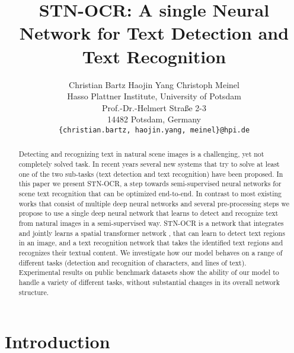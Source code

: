 \documentclass[10pt,twocolumn,letterpaper]{article}
\author{Christian Bartz \qquad Haojin Yang \qquad Christoph Meinel\\
Hasso Plattner Institute, University of Potsdam\\
Prof.-Dr.-Helmert Straße 2-3\\ 14482 Potsdam, Germany\\
{\tt\small \{christian.bartz, haojin.yang, meinel\}@hpi.de}
}
\begin{document}
	\title{STN-OCR: A single Neural Network for Text Detection and Text Recognition}
	\maketitle

	\begin{acronym}
	\end{acronym}

	\begin{abstract}
		Detecting and recognizing text in natural scene images is a challenging, yet not completely solved task.
		In recent years several new systems that try to solve at least one of the two sub-tasks (text detection and text recognition) have been proposed.
		In this paper we present STN-OCR, a step towards semi-supervised neural networks for scene text recognition that can be optimized end-to-end.
		In contrast to most existing works that consist of multiple deep neural networks and several pre-processing steps we propose to use a single deep neural network that learns to detect and recognize text from natural images in a semi-supervised way.
		STN-OCR is a network that integrates and jointly learns a spatial transformer network \cite{Jaderberg2015Spatial}, that can learn to detect text regions in an image, and a text recognition network that takes the identified text regions and recognizes their textual content.
		We investigate how our model behaves on a range of different tasks (detection and recognition of characters, and lines of text).
		Experimental results on public benchmark datasets show the ability of our model to handle a variety of different tasks, without substantial changes in its overall network structure.
	\end{abstract}

	\section{Introduction}
\end{document}
